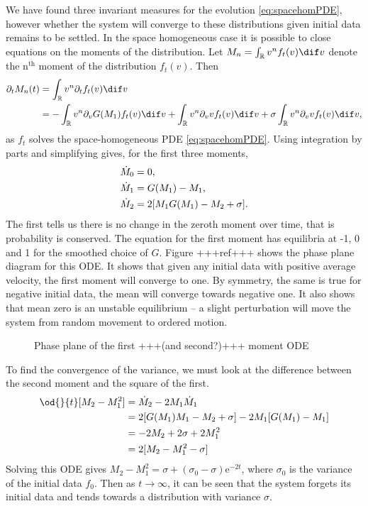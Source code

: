         We have found three invariant measures for the evolution \eqref{eq:spacehomPDE}, however whether the system will converge to these distributions given initial data remains to be settled. In the space homogeneous case it is possible to close equations on the moments of the distribution. Let $M_n = \int_\R v^n f_t(v) \dif v$ denote the n$^\text{th}$ moment of the distribution $f_t(v)$. Then
        \begin{align*}
            \partial_t M_n(t) &= \int_{\R}v^n \partial_t  f_t(v) \dif v\\
            &= - \int_{\R}v^n \partial_v G(M_1)f_t(v) \dif v + \int_{\R}v^n \partial_v vf_t(v) \dif v + \sigma \int_{\R}v^n \partial_vv f_t(v) \dif v,
        \end{align*}
        as $f_t$ solves the space-homogeneous PDE \eqref{eq:spacehomPDE}. Using integration by parts and simplifying gives, for the first three moments,
        \begin{align}\label{eq:momode}
            \dot{M}_0 &= 0,\notag \\
            \dot{M}_1 &= G(M_1) - M_1,\\
            \dot{M}_2 &= 2\lbrack M_1G(M_1) - M_2 + \sigma\rbrack\notag.
        \end{align}
        The first tells us there is no change in the zeroth moment over time, that is probability is conserved. The equation for the first moment has equilibria at -1, 0 and 1 for the smoothed choice of $G$. Figure +++ref+++ shows the phase plane diagram for this ODE. It shows that given any initial data with positive average velocity, the first moment will converge to one. By symmetry, the same is true for negative initial data, the mean will converge towards negative one. It also shows that mean zero is an unstable equilibrium -- a slight perturbation will move the system from random movement to ordered motion.
        \begin{figure}
            \centering
            \caption{Phase plane of the first  +++(and second?)+++ moment ODE}
            \label{fig:M1phase}
        \end{figure}
        To find the convergence of the variance, we must look at the difference between the second moment and the square of the first.
        \begin{align*}
            \od{}{t}\lbrack M_2 - M_1^2\rbrack &= \dot{M}_2 - 2M_1\dot{M}_1\\
            &= 2\lbrack G(M_1)M_1 - M_2 +\sigma\rbrack - 2M_1\lbrack G(M_1) - M_1\rbrack\\
            &= -2M_2 +2\sigma + 2M_1^2\\
            &= 2\lbrack M_2 - M_1^2 -\sigma\rbrack             
        \end{align*}
        Solving this ODE gives $M_2-M_1^2 = \sigma +(\sigma_0-\sigma)\mathrm{e}^{-2t}$, where $\sigma_0$ is the variance of the initial data $f_0$. Then as $t \to \infty$, it can be seen that the system forgets its initial data and tends towards a distribution with variance $\sigma$.
        
